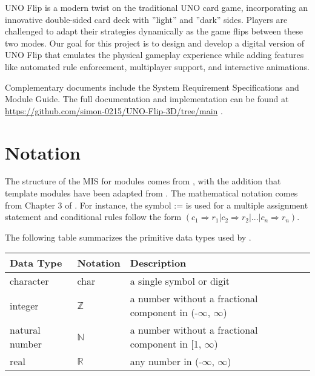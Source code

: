 \documentclass[12pt, titlepage]{article}
\begin{document}
UNO Flip is a modern twist on the traditional UNO card game, incorporating an innovative double-sided card deck with ”light” and ”dark” sides. Players are challenged to adapt their strategies dynamically as the game flips between these two modes. Our goal for this project is to design and develop a digital version of UNO Flip that emulates the physical gameplay experience while adding features like automated rule enforcement, multiplayer support, and interactive animations.

Complementary documents include the System Requirement Specifications and Module Guide. The full documentation and implementation can be found at \url{https://github.com/simon-0215/UNO-Flip-3D/tree/main} .


\section{Notation}


The structure of the MIS for modules comes from \citet{HoffmanAndStrooper1995},
with the addition that template modules have been adapted from
\cite{GhezziEtAl2003}.  The mathematical notation comes from Chapter 3 of
\citet{HoffmanAndStrooper1995}.  For instance, the symbol := is used for a
multiple assignment statement and conditional rules follow the form $(c_1
\Rightarrow r_1 | c_2 \Rightarrow r_2 | ... | c_n \Rightarrow r_n )$.

The following table summarizes the primitive data types used by \progname. 

\begin{center}
\renewcommand{\arraystretch}{1.2}
\noindent 
\begin{tabular}{l l p{7.5cm}} 
\toprule 
\textbf{Data Type} & \textbf{Notation} & \textbf{Description}\\ 
\midrule
character & char & a single symbol or digit\\
integer & $\mathbb{Z}$ & a number without a fractional component in (-$\infty$, $\infty$) \\
natural number & $\mathbb{N}$ & a number without a fractional component in [1, $\infty$) \\
real & $\mathbb{R}$ & any number in (-$\infty$, $\infty$)\\
\bottomrule
\end{tabular} 
\end{center}
\end{document}
